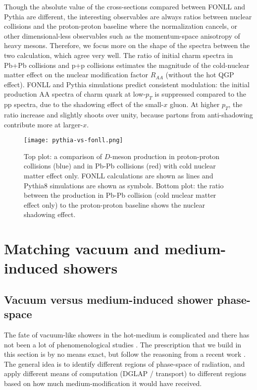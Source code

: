 Though the absolute value of the cross-sections compared between FONLL and Pythia are different, the interesting observables are always ratios between nuclear collisions and the proton-proton baseline where the normalization cancels, or other dimensional-less observables such as the momentum-space anisotropy of heavy mesons.
Therefore, we focus more on the shape of the spectra between the two calculation, which agree very well.
The ratio of initial charm spectra in Pb+Pb collisions and p+p collisions estimates the magnitude of the cold-nuclear matter effect on the nuclear modification factor $R_{AA}$ (without the hot QGP effect).
FONLL and Pythia simulations predict consistent modulation: the initial production AA spectra of charm quark at low-$p_T$ is suppressed compared to the pp spectra, due to the shadowing effect of the small-$x$ gluon. 
At higher $p_T$, the ratio increase and slightly shoots over unity, because partons from anti-shadowing contribute more at larger-$x$.

\begin{figure}
\singlespacing
\centering
\texttt{[image: pythia-vs-fonll.png]}
\caption[Top plot: a comparison of $D$-meson production in proton-proton]{Top plot: a comparison of $D$-meson production in proton-proton collisions (blue) and in Pb-Pb collisions (red) with cold nuclear matter effect only. FONLL calculations are shown as lines and Pythia8 simulations are shown as symbols. Bottom plot: the ratio between the production in Pb-Pb collision (cold nuclear matter effect only) to the proton-proton baseline shows the nuclear shadowing effect.}
\label{fig:pythia-fonll}
\end{figure}

\section{Matching vacuum and medium-induced showers}
\subsection{Vacuum versus medium-induced shower phase-space}
\label{section:match}
The fate of vacuum-like showers in the hot-medium is complicated and there has not been a lot of phenomenological studies \cite{Cao:2017zih,PhysRevLett.120.232001,PhysRevLett.120.232001,Caucal:2018ofz}.
The prescription that we build in this section is by no means exact, but follow the reasoning from a recent work \cite{PhysRevLett.120.232001}.
The general idea is to identify different regions of phase-space of radiation, and apply different means of computation (DGLAP / transport) to different regions based on how much medium-modification it would have received.

